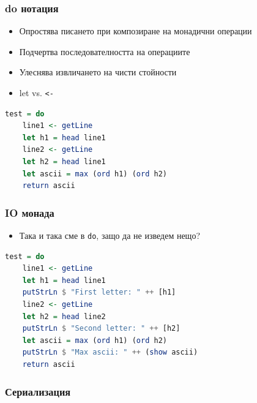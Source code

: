 \documentclass{beamer}
\begin{document}
\begin{frame}[fragile]
  \frametitle{do нотация}
\begin{itemize}
  \item Опростява писането при композиране на монадични операции
  \item Подчертва последователността на операциите
  \item Улеснява извличането на чисти стойности
  \item let vs. \verb#<-#
\end{itemize}
\begin{lstlisting}[basicstyle=\small,language=Haskell]
test = do
    line1 <- getLine
    let h1 = head line1
    line2 <- getLine
    let h2 = head line1
    let ascii = max (ord h1) (ord h2)
    return ascii
\end{lstlisting}
\end{frame}


\begin{frame}[fragile]
  \frametitle{IO монада}
\begin{itemize}
  \item Така и така сме в \verb#do#, защо да не изведем нещо?
\end{itemize}
\begin{lstlisting}[basicstyle=\small,language=Haskell]
test = do
    line1 <- getLine
    let h1 = head line1
    putStrLn $ "First letter: " ++ [h1]
    line2 <- getLine
    let h2 = head line2
    putStrLn $ "Second letter: " ++ [h2]
    let ascii = max (ord h1) (ord h2)
    putStrLn $ "Max ascii: " ++ (show ascii)
    return ascii
\end{lstlisting}
\end{frame}


\begin{frame}[fragile]
  \frametitle{Сериализация}
\end{frame}
\end{document}
